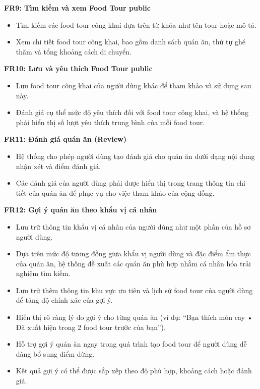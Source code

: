 \textbf{FR9: Tìm kiếm và xem Food Tour public} 
\begin{itemize}[label=\textbullet]
    \item Tìm kiếm các food tour công khai dựa trên từ khóa như tên
    tour hoặc mô tả.
    \item Xem chi tiết food tour công khai, bao gồm danh sách quán ăn, 
    thứ tự ghé thăm và tổng khoảng cách di chuyển.
\end{itemize}

\textbf{FR10: Lưu và yêu thích Food Tour public} 
\begin{itemize}[label=\textbullet]
    \item Lưu food tour công khai của người dùng khác để tham
khảo và sử dụng sau này.
    \item Đánh giá cụ thể mức độ yêu thích đối với food tour công khai, và hệ
thống phải hiển thị số lượt yêu thích trung bình của mỗi food tour.
\end{itemize}

\textbf{FR11: Đánh giá quán ăn (Review)} 
\begin{itemize}[label=\textbullet]
    \item Hệ thống cho phép người dùng tạo đánh giá cho quán ăn dưới dạng nội dung nhận xét và
điểm đánh giá.
    \item Các đánh giá của người dùng phải được hiển thị trong trang thông tin chi tiết của quán ăn để
phục vụ cho việc tham khảo của cộng đồng.
\end{itemize}

\textbf{FR12: Gợi ý quán ăn theo khẩu vị cá nhân} 
\begin{itemize}[label=\textbullet]
    \item Lưu trữ thông tin khẩu vị cá nhân của người dùng như một phần của hồ sơ
người dùng.
    \item Dựa trên mức độ tương đồng giữa khẩu vị người dùng và đặc điểm ẩm thực của quán ăn, hệ
thống đề xuất các quán ăn phù hợp nhằm cá nhân hóa trải nghiệm tìm kiếm.
    \item Lưu trữ thêm thông tin khu vực ưu tiên và lịch sử food tour của người dùng
     để tăng độ chính xác của gợi ý.
    \item Hiển thị rõ ràng lý do gợi ý cho từng quán ăn (ví dụ: “Bạn thích món cay • Đã 
    xuất hiện trong 2 food tour trước của bạn”).
    \item Hỗ trợ gợi ý quán ăn ngay trong quá trình tạo food tour để người dùng dễ dàng bổ sung 
    điểm dừng.
    \item Kết quả gợi ý có thể được sắp xếp theo độ phù hợp, khoảng cách hoặc đánh giá.
\end{itemize}

